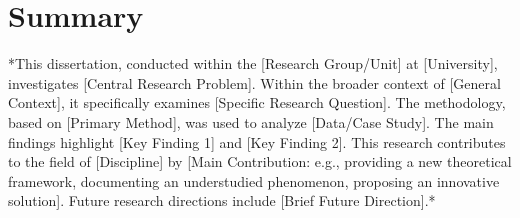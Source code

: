 \chapter*{Summary}

*This dissertation, conducted within the [Research Group/Unit] at [University], investigates [Central Research Problem]. Within the broader context of [General Context], it specifically examines [Specific Research Question]. The methodology, based on [Primary Method], was used to analyze [Data/Case Study]. The main findings highlight [Key Finding 1] and [Key Finding 2]. This research contributes to the field of [Discipline] by [Main Contribution: e.g., providing a new theoretical framework, documenting an understudied phenomenon, proposing an innovative solution]. Future research directions include [Brief Future Direction].*